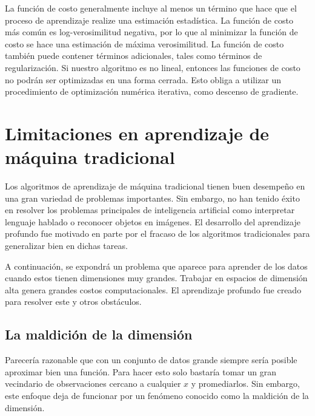\vspace{1em}

La función de costo generalmente incluye al menos un término que hace que el proceso de aprendizaje realize una estimación estadística. La función de costo más común es log-verosimilitud negativa, por lo que al minimizar la función de costo se hace una estimación de máxima verosimilitud. La función de costo también puede contener términos adicionales, tales como términos de regularización. Si nuestro algoritmo es no lineal, entonces las funciones de costo no podrán ser optimizadas en una forma cerrada. Esto obliga a utilizar un procedimiento de optimización numérica iterativa, como descenso de gradiente. 
\cite{goodfellow-et-al-2016}

\section{Limitaciones en aprendizaje de máquina tradicional}
Los algoritmos de aprendizaje de máquina tradicional tienen buen desempeño en una gran variedad de problemas importantes. Sin embargo, no han tenido éxito en resolver los problemas principales de inteligencia artificial como interpretar lenguaje hablado o reconocer objetos en imágenes. El desarrollo del aprendizaje profundo fue motivado en parte por el fracaso de los algoritmos tradicionales para generalizar bien en dichas tareas.

\vspace{1em}

A continuación, se expondrá un problema que aparece para aprender de los datos cuando estos tienen dimensiones muy grandes. Trabajar en espacios de dimensión alta genera grandes costos computacionales. El aprendizaje profundo fue creado para resolver este y otros obstáculos.
\cite{goodfellow-et-al-2016}

\subsection{La maldición de la dimensión}
Parecería razonable que con un conjunto de datos grande siempre sería posible aproximar bien una función. Para hacer esto solo bastaría tomar un gran vecindario de observaciones cercano a cualquier $x$ y promediarlos. Sin embargo, este enfoque deja de funcionar por un fenómeno conocido como la maldición de la dimensión.
\cite{Bishop:2006:PRM:1162264}
\cite{hastie01statisticallearning}
\cite{Murphy:2012:MLP:2380985}

\vspace{1em}

